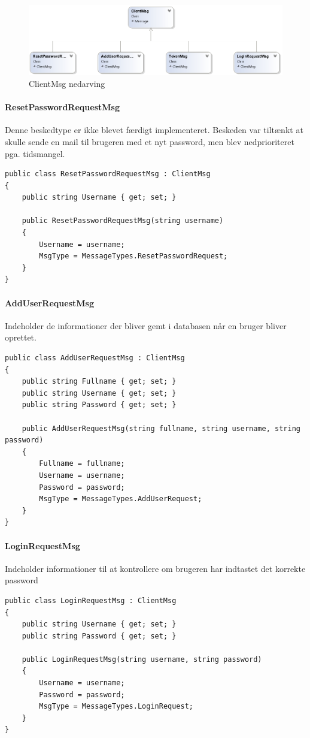 \begin{figure}
	\centering
	\includegraphics[width=0.9\linewidth]{figs/connection/ClientMsgUML.png}
	\caption{ClientMsg nedarving}
	\label{fig:ClientMsgUML}
\end{figure}

\paragraph{ResetPasswordRequestMsg}
Denne beskedtype er ikke blevet færdigt implementeret. Beskeden var tiltænkt at skulle sende en mail til brugeren med et nyt password, men blev nedprioriteret pga. tidsmangel.
\begin{lstlisting}[caption=ResetPasswordRequestMsg, label=code:ResetPasswordRequestMsg]
public class ResetPasswordRequestMsg : ClientMsg
{
	public string Username { get; set; }
	
	public ResetPasswordRequestMsg(string username)
	{
		Username = username;
		MsgType = MessageTypes.ResetPasswordRequest;
	}
}
\end{lstlisting}

\paragraph{AddUserRequestMsg}
Indeholder de informationer der bliver gemt i databasen når en bruger bliver oprettet.
\begin{lstlisting}[caption=AddUserRequestMsg, label=code:AddUserRequestMsg]
public class AddUserRequestMsg : ClientMsg
{
	public string Fullname { get; set; }
	public string Username { get; set; }
	public string Password { get; set; }
	
	public AddUserRequestMsg(string fullname, string username, string password)
	{
		Fullname = fullname;
		Username = username;
		Password = password;
		MsgType = MessageTypes.AddUserRequest;
	}
}
\end{lstlisting}

\paragraph{LoginRequestMsg}
Indeholder informationer til at kontrollere om brugeren har indtastet det korrekte password
\begin{lstlisting}[caption=LoginRequestMsg, label=code:LoginRequestMsg]
public class LoginRequestMsg : ClientMsg
{
	public string Username { get; set; }
	public string Password { get; set; }
	
	public LoginRequestMsg(string username, string password)
	{
		Username = username;
		Password = password;
		MsgType = MessageTypes.LoginRequest;
	}
}
\end{lstlisting}

